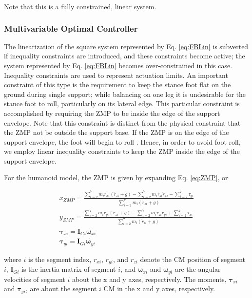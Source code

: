 \documentclass{llncs}
\begin{document}
Note that this is a fully constrained, linear system.



\subsubsection{Multivariable Optimal Controller}

The linearization of the square system represented by Eq. \ref{eq:FBLin} is subverted if inequality constraints are introduced, and these constraints become active;  
the system represented by Eq. \ref{eq:FBLin} becomes over-constrained in this case.  
Inequality constraints are used to represent actuation limits.  
An important constraint of this type is the requirement to keep the stance foot flat on the ground during single support;  
while balancing on one leg it is undesirable for the stance foot to roll, particularly on its lateral edge.  
This particular constraint is accomplished by requiring the ZMP to be inside the edge of the support envelope.  
Note that this constraint is distinct from the physical constraint that the ZMP not be outside the support base.  
If the ZMP is on the edge of the support envelope, the foot will begin to roll \cite{popovic2005ground}.  
Hence, in order to avoid foot roll, we employ linear inequality constraints to keep the ZMP inside the edge of the support envelope.

For the humanoid model, the ZMP is given by expanding Eq. \ref{eq:ZMP}, or

\begin{eqnarray}
x_{ZMP} = \frac{\sum_{i=2}^7 m_i r_{xi} \left( \ddot{r}_{zi} + g\right) - \sum_{i=2}^7 m_i r_{zi} \ddot{r}_{xi} - \sum_{i=2}^7 \tau_{yi}}
{\sum_{i=2}^7 m_i \left( \ddot{r}_{zi} + g\right)} \\
y_{ZMP} = \frac{\sum_{i=2}^7 m_i r_{yi} \left( \ddot{r}_{zi} + g\right) - \sum_{i=2}^7 m_i r_{zi} \ddot{r}_{yi} + \sum_{i=2}^7 \tau_{xi}}
{\sum_{i=2}^7 m_i \left( \ddot{r}_{zi} + g\right)} \\
\mathbf{\tau}_{xi} = \mathbf{I}_{Gi} \dot{\mathbf{\omega}_{xi}} \\
\mathbf{\tau}_{yi} = \mathbf{I}_{Gi} \dot{\mathbf{\omega}_{yi}}
\label{eq:ZMPexpanded}
\end{eqnarray}

\noindent where $i$ is the segment index, $r_{xi}$, $r_{yi}$, and $r_{zi}$ denote the CM position of segment $i$, $\mathbf{I}_{Gi}$ is the inertia matrix of 
segment $i$, and $\mathbf{\omega}_{xi}$ and $\mathbf{\omega}_{yi}$ are the angular velocities of segment $i$ about the x and y axes, respectively.
The moments, $\mathbf{\tau}_{xi}$ and $\mathbf{\tau}_{yi}$, are about the segment $i$ CM in the x and y axes, respectively.
\end{document}
